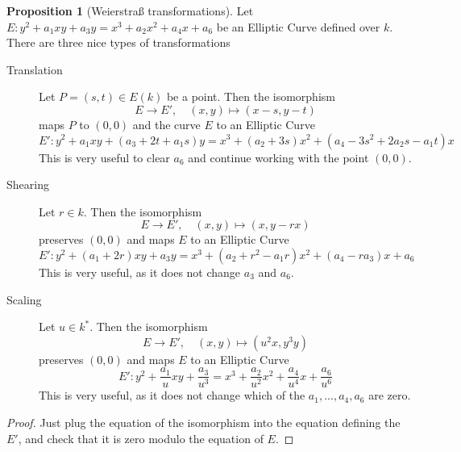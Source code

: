 \documentclass{scrartcl}
\theoremstyle{definition}
\newtheorem{prop}[subsection]{Proposition}
\begin{document}
\begin{prop}[Weierstraß transformations]
    \label{prop:weierstrass_transformations}
    Let $E: y^2 + a_1 x y + a_3 y = x^3 + a_2 x^2 + a_4 x + a_6$ be an Elliptic Curve defined over $k$.
    There are three nice types of transformations
    \begin{description}
        \item[Translation] Let $P = (s, t) \in E(k)$ be a point. Then the isomorphism
        \begin{equation*}
            E \to E', \quad (x, y) \mapsto (x - s, y - t)
        \end{equation*}
        maps $P$ to $(0, 0)$ and the curve $E$ to an Elliptic Curve
        \begin{equation*}
            E': y^2 + a_1 x y + (a_3 + 2t + a_1 s) y = x^3 + (a_2 + 3 s) x^2 + (a_4 - 3 s^2 + 2 a_2 s - a_1 t) x
        \end{equation*}
        This is very useful to clear $a_6$ and continue working with the point $(0, 0)$.
        \item[Shearing] Let $r \in k$. Then the isomorphism
        \begin{equation*}
            E \to E', \quad (x, y) \mapsto (x, y - r x)
        \end{equation*}
        preserves $(0, 0)$ and maps $E$ to an Elliptic Curve
        \begin{equation*}
            E': y^2 + (a_1 + 2r) x y + a_3 y = x^3 + (a_2 + r^2 - a_1 r) x^2 + (a_4 - r a_3) x + a_6
        \end{equation*}
        This is very useful, as it does not change $a_3$ and $a_6$.
        \item[Scaling] Let $u \in k^*$. Then the isomorphism
        \begin{equation*}
            E \to E', \quad (x, y) \mapsto (u^2 x, y^3 y)
        \end{equation*}
        preserves $(0, 0)$ and maps $E$ to an Elliptic Curve
        \begin{equation*}
            E': y^2 + \frac {a_1} u x y + \frac {a_3} {u^3} = x^3 + \frac {a_2} {u^2} x^2 + \frac {a_4} {u^4} x + \frac {a_6} {u^6}
        \end{equation*}
        This is very useful, as it does not change which of the $a_1, ..., a_4, a_6$ are zero.
    \end{description}
\end{prop}
\begin{proof}
    Just plug the equation of the isomorphism into the equation defining the $E'$, and check that it is zero modulo the equation of $E$.
\end{proof}
\end{document}
